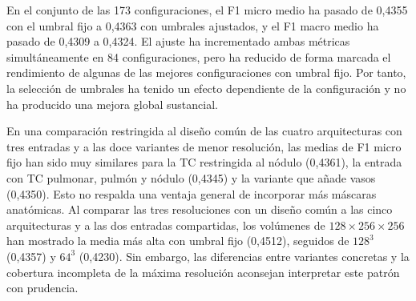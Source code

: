 \begin{table}[!htbp]
\centering
\scriptsize
\caption{F1 por resultado de configuraciones representativas basadas únicamente en imagen. M(P,N,V) representa los canales correspondientes a las máscaras de pulmón, nódulo y vasos, respectivamente.}
\label{tab:resultados-dl-imagen-etiquetas}
\end{table}

En el conjunto de las 173 configuraciones, el F1 micro medio ha pasado de 0,4355 con el umbral fijo a 0,4363 con umbrales ajustados, y el F1 macro medio ha pasado de 0,4309 a 0,4324. El ajuste ha incrementado ambas métricas simultáneamente en 84 configuraciones, pero ha reducido de forma marcada el rendimiento de algunas de las mejores configuraciones con umbral fijo. Por tanto, la selección de umbrales ha tenido un efecto dependiente de la configuración y no ha producido una mejora global sustancial.

En una comparación restringida al diseño común de las cuatro arquitecturas con tres entradas y a las doce variantes de menor resolución, las medias de F1 micro fijo han sido muy similares para la TC restringida al nódulo (0,4361), la entrada con TC pulmonar, pulmón y nódulo (0,4345) y la variante que añade vasos (0,4350). Esto no respalda una ventaja general de incorporar más máscaras anatómicas. Al comparar las tres resoluciones con un diseño común a las cinco arquitecturas y a las dos entradas compartidas, los volúmenes de $128 \times 256 \times 256$ han mostrado la media más alta con umbral fijo (0,4512), seguidos de $128^3$ (0,4357) y $64^3$ (0,4230). Sin embargo, las diferencias entre variantes concretas y la cobertura incompleta de la máxima resolución aconsejan interpretar este patrón con prudencia.

